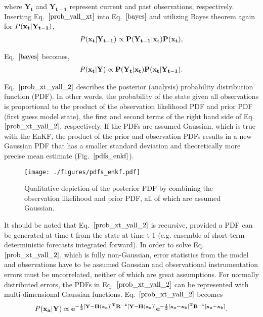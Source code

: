 \documentclass{ttuthes2007}
\newcommand{\tab}{\hspace*{2em}}  %
\begin{document}
where $\mathbf{Y_t}$ and $\mathbf{Y_{t-1}}$ represent current and past observations, respectively. Inserting Eq.~$\ref{prob_yall_xt}$ into Eq.~$\ref{bayes}$ and utilizing Bayes theorem again for $P(\bf{x_t} | \bf{Y_{t-1}})$,
\begin{align}
	P(\bf{x_t} | \bf{Y_{t-1}}) \propto P(\bf{Y_{t-1}} | \bf{x_t})P(\bf{x_t}),
\end{align}

Eq.~$\ref{bayes}$ becomes,
\begin{align}\label{prob_xt_yall_2}
	P(\bf{x_t} | \bf{Y}) \propto P(\bf{Y_t} | \bf{x_t})P(\bf{x_t} | \bf{Y_{t-1}}).
\end{align}

Eq.~$\ref{prob_xt_yall_2}$ describes the posterior (analysis) probability distribution function (PDF). In other words, the probability of the state given all observations is proportional to the product of the observation likelihood PDF and prior PDF (first guess model state), the first and second terms of the right hand side of Eq.~$\ref{prob_xt_yall_2}$, respectively. If the PDFs are assumed Gaussian, which is true with the EnKF, the product of the prior and observation PDFs results in a new Gaussian PDF that has a smaller standard deviation and theoretically more precise mean estimate (Fig.~$\ref{pdfs_enkf}$). \\

\begin{figure}[t]
  \centering
  \noindent\texttt{[image: ./figures/pdfs\_enkf.pdf]}\\
  \caption{Qualitative depiction of the posterior PDF by combining the observation likelihood and prior PDF, all of which are assumed Gaussian.}
\label{pdfs_enkf}
\end{figure}

\tab It should be noted that Eq.~$\ref{prob_xt_yall_2}$ is recursive, provided a PDF can be generated at time t from the state at time t-1 (e.g. ensemble of short-term deterministic forecasts integrated forward). In order to solve Eq.~$\ref{prob_xt_yall_2}$, which is fully non-Gaussian, error statistics from the model and observations have to be assumed Gaussian and observational instrumentation errors must be uncorrelated, neither of which are great assumptions. For normally distributed errors, the PDFs in Eq.~$\ref{prob_xt_yall_2}$ can be represented with multi-dimensional Gaussian functions. Eq.~$\ref{prob_xt_yall_2}$ becomes
\begin{align}\label{prob_withgauss}
	P(\bf{x_a} | \bf{Y}) \propto e^{-\frac{1}{2} [\bf{Y}-H(\bf{x_a})]^T \bf{R}^{-1} [\bf{Y}-H(\bf{x_a})]} e^{-\frac{1}{2} [\bf{x_a} - \bf{x_b}]^T \bf{B}^{-1} [\bf{x_a} - \bf{x_b}]}.
\end{align}
\end{document}
